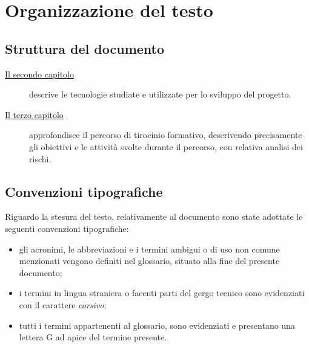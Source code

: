 \section{Organizzazione del testo}

\subsection{Struttura del documento}

\begin{description}
    \item[{\hyperref[cap:tecnologie]{Il secondo capitolo}}] descrive le tecnologie studiate e utilizzate per lo sviluppo del progetto.
    
    \item[{\hyperref[cap:descrizione-stage]{Il terzo capitolo}}] approfondisce il percorso di tirocinio formativo, descrivendo precisamente gli obiettivi e le attività svolte durante il percorso,
    con relativa analisi dei rischi.
    
\end{description}

\subsection{Convenzioni tipografiche}
Riguardo la stesura del testo, relativamente al documento sono state adottate le seguenti convenzioni tipografiche:
\begin{itemize}
	\item gli acronimi, le abbreviazioni e i termini ambigui o di uso non comune menzionati vengono definiti nel glossario, situato alla fine del presente documento;
	\item i termini in lingua straniera o facenti parti del gergo tecnico sono evidenziati con il carattere \emph{corsivo};
	\item tutti i termini appartenenti al glossario, sono evidenziati e presentano una lettera G ad apice del termine presente.
\end{itemize}

